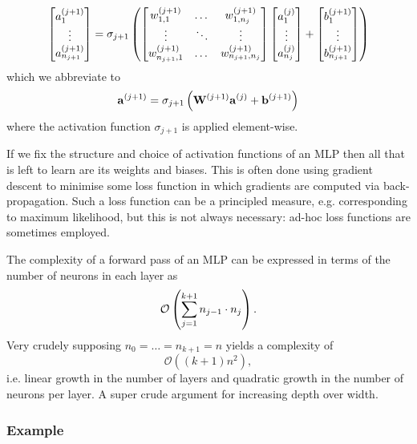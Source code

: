 \documentclass[11pt]{article}
\begin{document}
$$
\begin{bmatrix}
    a_1^{(j+1)}\\
    \vdots\\
    a_{n_{j+1}}^{(j+1)}
\end{bmatrix}
=
\sigma_{j+1}\left(
\begin{bmatrix}
    w_{1,1}^{(j+1)} & \dots & w_{1,n_j}^{(j+1)}\\
    \vdots & \ddots & \vdots\\
    w_{n_{j+1},1}^{(j+1)} & \dots & w_{n_{j+1},n_j}^{(j+1)}
\end{bmatrix}
\begin{bmatrix}
    a_1^{(j)}\\
    \vdots\\
    a_{n_j}^{(j)}
\end{bmatrix}
+
\begin{bmatrix}
    b_1^{(j+1)}\\
    \vdots\\
    b_{n_{j+1}}^{(j+1)}
\end{bmatrix}
\right)
$$
which we abbreviate to
$$
\mathbf{a}^{(j+1)}=\sigma_{j+1}\left(\mathbf{W}^{(j+1)}\mathbf{a}^{(j)}+\mathbf{b}^{(j+1)}\right)
$$
where the activation function $\sigma_{j+1}$ is applied element-wise.

If we fix the structure and choice of activation functions of an MLP then all that is left to learn are its weights and biases. This is often done using gradient descent to minimise some loss function in which gradients are computed via back-propagation. Such a loss function can be a principled measure, e.g. corresponding to maximum likelihood, but this is not always necessary: ad-hoc loss functions are sometimes employed.

\begin{tcolorbox}[title={\centering\textbf{Advocating for depth over width}}, colback=myLightBlue, colbacktitle=myDarkBlue, colframe=myDarkBlue, coltitle=white]
    The complexity of a forward pass of an MLP can be expressed in terms of the number of neurons in each layer as
    $$
    \mathcal{O}
    \left(
    \sum_{j=1}^{k+1}n_{j-1}\cdot n_j
    \right).
    $$
    Very crudely supposing $n_0=\dots=n_{k+1}=n$ yields a complexity of
    $$
    \mathcal{O}((k+1)n^2),
    $$
    i.e. linear growth in the number of layers and quadratic growth in the number of neurons per layer. A super crude argument for increasing depth over width.
\end{tcolorbox}

\subsubsection{Example}
\end{document}
